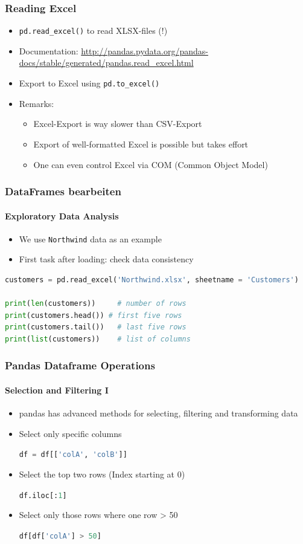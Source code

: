 \documentclass[ngerman]{beamer}
\begin{document}
\begin{frame}
\frametitle{Reading Excel}

\begin{itemize}
\item \lstinline[language={Python}]{pd.read_excel()} to read XLSX-files (!) \item Documentation: \url{http://pandas.pydata.org/pandas-docs/stable/generated/pandas.read_excel.html}
\item Export to Excel using \lstinline[language={Python}]{pd.to_excel()}
\item Remarks:
\begin{itemize}
	\item Excel-Export is way slower than CSV-Export
	\item Export of well-formatted Excel is possible but takes effort
	\item One can even control Excel via COM (Common Object Model)
\end{itemize}
\end{itemize}
\end{frame}

\begin{frame}[fragile]
\frametitle{DataFrames bearbeiten}
\framesubtitle{Exploratory Data Analysis}

\begin{itemize}
	\item We use \texttt{Northwind} data as an example
	\item First task after loading: check data consistency
\end{itemize}

\begin{lstlisting}[language={Python}]
customers = pd.read_excel('Northwind.xlsx', sheetname = 'Customers')

print(len(customers))     # number of rows
print(customers.head()) # first five rows
print(customers.tail())   # last five rows
print(list(customers))    # list of columns
\end{lstlisting}
\end{frame}



\begin{frame}[fragile]
\frametitle{Pandas Dataframe Operations}
\framesubtitle{Selection and Filtering I}

\begin{itemize}
	\item pandas has advanced methods for selecting, filtering and transforming data 
\item Select only specific columns

\lstinline[language={Python}]{df = df[['colA', 'colB']]}

\item Select the top two rows (Index starting at 0)

\lstinline[language={Python}]{df.iloc[:1]}

\item Select only those rows where one row > 50

\lstinline[language={Python}]{df[df['colA'] > 50]}
\end{itemize}
\end{frame}
\end{document}
